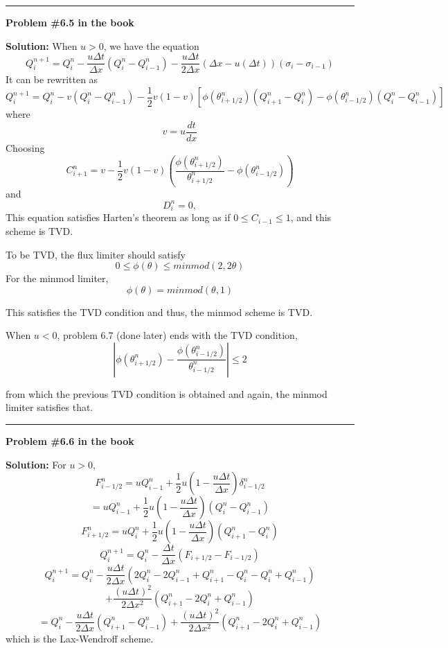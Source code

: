 \documentclass[11pt]{article}
\begin{document}


\vskip 1cm
\hrule
{\bf Problem \#6.5 in the book}


\vskip 1cm
{\bf Solution:}
When $u>0$, we have the equation 
\[ Q_i^{n+1}= Q_i^{n}- \frac{u\Delta t}{\Delta x} ( Q_{i}^n-Q_{i-1}^n) - \frac{u\Delta t}{2\Delta x}(\Delta x-u(\Delta t))(\sigma_{i}-\sigma_{i-1})  \]
It can be rewritten as 
\[Q_i^{n+1}= Q_i^{n}-v(Q_{i}^n-Q_{i-1}^n) -\frac{1}{2} v(1-v)[\phi(\theta_{i+1/2}^n)(Q_{i+1}^n-Q_{i}^n)-\phi(\theta_{i-1/2}^n)(Q_{i}^n-Q_{i-1}^n) ]\]
where 
\[ v= u \frac{dt}{dx}\]
Choosing 
\[  C_{i+1}^n= v -\frac{1}{2} v(1-v)(\frac{\phi(\theta_{i+1/2}^n)}{\theta_{i+1/2}^n}-\phi(\theta_{i-1/2}^n) ) \] and
\[D_i^n =0 ,\]
This equation satisfies Harten's theorem as long as if $ 0 \leq C_{i-1}\leq 1$, and this scheme is TVD. 

To be TVD, the flux limiter should satisfy
\[ 0 \leq \phi(\theta) \leq minmod(2,2\theta)\]
For the minmod limiter, 
\[ \phi(\theta) = minmod(\theta,1) \]


This satisfies the TVD condition and thus, the minmod scheme is TVD.

When $u <0$, problem 6.7 (done later) ends with the TVD condition, 
\[|\phi(\theta_{i+1/2}^n)-\frac{\phi(\theta_{i-1/2}^n)}{\theta_{i-1/2}^n} |\leq 2 \]

from which the previous TVD condition is obtained and again, the minmod limiter satisfies that.

\vskip 1cm
\hrule
{\bf Problem \#6.6 in the book}

\vskip 1cm
{\bf Solution:}
For $u>0$,
\[F_{i-1/2}^n= uQ_{i-1}^n + \frac{1}{2}u(1-\frac{u\Delta t}{\Delta x})\delta_{i-1/2}^n\]
\[= uQ_{i-1}^n + \frac{1}{2}u(1-\frac{u\Delta t}{\Delta x})(Q_i^n-Q_{i-1}^n)\]
\[F_{i+1/2}^n= uQ_{i}^n + \frac{1}{2}u(1-\frac{u\Delta t}{\Delta x})(Q_{i+1}^n-Q_{i}^n)\]
\[ Q_i^{n+1}= Q_i^{n} - \frac{\Delta t}{\Delta x} (F_{i+1/2} -F_{i-1/2} )\]
\[ Q_i^{n+1}= Q_i^{n} - \frac{u\Delta t}{2\Delta x} (2Q_i^{n} -2Q_{i-1}^{n} + Q_{i+1}^n-Q_{i}^n -Q_i^n+Q_{i-1}^n)\]
\[+\frac{(u\Delta t)^2}{2\Delta x^2}(Q_{i+1}^n-2Q_{i}^n+Q_{i-1}^n)\]
\[= Q_i^{n} - \frac{u\Delta t}{2\Delta x} ( Q_{i+1}^n-Q_{i-1}^n)+\frac{(u\Delta t)^2}{2\Delta x^2}(Q_{i+1}^n-2Q_{i}^n+Q_{i-1}^n)\]
which is the Lax-Wendroff scheme.
\end{document}
